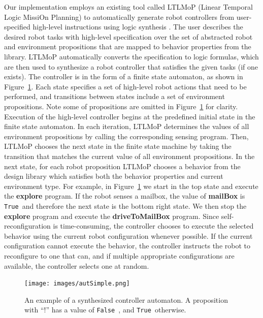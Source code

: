\documentclass[journal]{IEEEtran}
\newcommand{\lt}{{\tt True }}
\newcommand{\lf}{{\tt False }}
\begin{document}
Our implementation employs an existing tool called LTLMoP (Linear Temporal Logic MissiOn Planning) to automatically generate robot controllers from user-specified high-level instructions using logic synthesis \cite{DBLP:conf/iros/FinucaneJK10,DBLP:journals/trob/Kress-GazitFP09}.
The user describes the desired robot tasks with high-level specification over the set of abstracted robot and environment propositions that are mapped to behavior properties from the library.
LTLMoP automatically converts the specification to logic formulas, which are then used to synthesize a robot controller that satisfies the given tasks (if one exists).
The controller is in the form of a finite state automaton, as shown in Figure~\ref{fig:autSimple}.
Each state specifies a set of high-level robot actions that need to be performed, and transitions between states include a set of environment propositions.
Note some of propositions are omitted in Figure~\ref{fig:autSimple} for clarity.
Execution of the high-level controller begins at the predefined initial state in the finite state automaton. In each iteration, LTLMoP determines the values of all environment propositions by calling the corresponding sensing program. Then, LTLMoP chooses the next state in the finite state machine by taking the transition that matches the current value of all environment propositions. 
In the next state, for each robot proposition LTLMoP chooses a behavior from the design library which satisfies both the behavior properties and current environment type.
For example, in Figure~\ref{fig:autSimple} we start in the top state and execute the \textbf{explore} program.
If  the robot senses a mailbox, the value of \textbf{mailBox} is \lt and therefore the next state is the bottom right state. We then stop the \textbf{explore} program and execute the \textbf{driveToMailBox} program.
Since self-reconfiguration is time-consuming, the controller chooses to execute the selected behavior using the current robot configuration whenever possible.
If the current configuration cannot execute the behavior, the controller instructs the robot to reconfigure to one that can, and if multiple appropriate configurations are available, the controller selects one at random.

\begin{figure}
\begin{center}
\texttt{[image: images/autSimple.png]}
\caption{An example of a synthesized controller automaton. A proposition with ``!'' has a value of \lf, and \lt otherwise.}
\label{fig:autSimple}
\end{center}
\end{figure}
\end{document}
